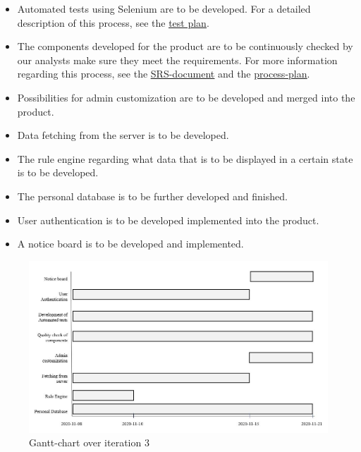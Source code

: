 \begin{itemize}
    \item Automated tests using Selenium are to be developed. For a detailed description of this process, see the \href{https://gitlab.liu.se/tddc88-company-3-2020/deploy/-/tree/Document_branch/Test_Plan}{\underline{test plan}}.
    \item The components developed for the product are to be continuously checked by our analysts make sure they meet the requirements. For more information regarding this process, see the \href{https://gitlab.liu.se/tddc88-company-3-2020/deploy/-/tree/Document_branch/Software%20Requirements%20Specification}{\underline{SRS-document}}  and the \href{https://gitlab.liu.se/tddc88-company-3-2020/deploy/-/tree/Document_branch/Process_plan}{\underline{process-plan}}. 
    \item Possibilities for admin customization are to be developed and merged into the product. 
    \item Data fetching from the server is to be developed. 
    \item The rule engine regarding what data that is to be displayed in a certain state is to be developed.
    \item The personal database is to be further developed and finished. 
    \item User authentication is to be developed implemented into the product. 
    \item A notice board is to be developed and implemented.
    
\end{itemize} 

\begin{figure}[H]
\centering
\includegraphics[width=\linewidth]{Pictures/iteration_3.JPG}
\caption{Gantt-chart over iteration 3}
\label{fig:iteration_3}
\end{figure}
 

